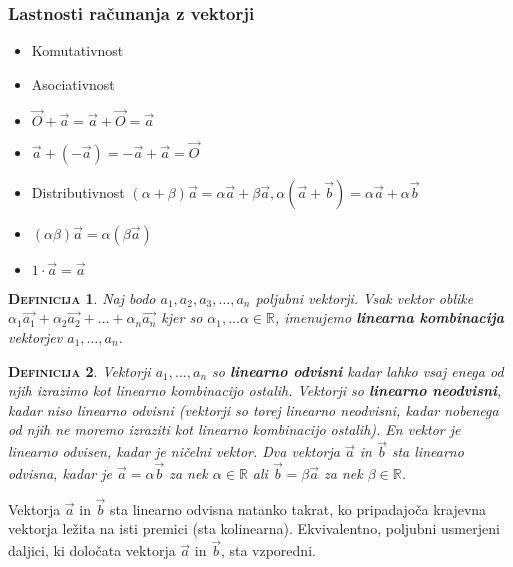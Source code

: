 \documentclass[a4paper,12pt]{article}
\newtheorem*{definicija}{\textsc{Definicija}}
\begin{document}
\begin{center}
\subsubsection{Lastnosti računanja z vektorji}
\end{center}

\begin{itemize}
\item Komutativnost
\item Asociativnost
\item $\vec{O} + \vec{a} = \vec{a} + \vec{O} = \vec{a}$
\item $\vec{a} + (-\vec{a}) = -\vec{a} + \vec{a} = \vec{O}$
\item Distributivnost $(\alpha + \beta)\vec{a} = \alpha \vec{a} + \beta \vec{a}, \alpha (\vec{a} + \vec{b}) = \alpha \vec{a} + \alpha \vec{b}$
\item $(\alpha \beta ) \vec{a} = \alpha ( \beta \vec{a})$
\item  $ 1 \cdot \vec{a} = \vec{a}$\\
\end{itemize}

\begin{definicija}
Naj bodo $a_1, a_2, a_3, \ldots , a_n$ poljubni vektorji. Vsak vektor oblike \linebreak  $\alpha_1 \vec{a_1} + \alpha_2 \vec{a_2} + \ldots + \alpha_n \vec{a_n}$ kjer so $ \alpha_1, \ldots \alpha \in \mathbb{R} $, imenujemo \textbf{linearna kombinacija} vektorjev $a_1, \ldots , a_n$.\\
\end{definicija}

\begin{definicija}
Vektorji $a_1, \ldots , a_n$ so \textbf{linearno odvisni} kadar lahko vsaj enega od njih izrazimo kot linearno kombinacijo ostalih. Vektorji so \textbf{linearno neodvisni}, kadar niso linearno odvisni (vektorji so torej linearno neodvisni, kadar nobenega od njih ne moremo izraziti kot linearno kombinacijo ostalih). En vektor je linearno odvisen, kadar je ničelni vektor. Dva vektorja $\vec{a}$ in $\vec{b}$ sta linearno odvisna, kadar je $ \vec{a} = \alpha \vec{b}$ za nek $\alpha \in \mathbb{R}$ ali $\vec{b} = \beta \vec{a}$ za nek $\beta \in \mathbb{R}$. \\
\end{definicija}

Vektorja $\vec{a}$ in $\vec{b}$ sta linearno odvisna natanko takrat, ko pripadajoča krajevna vektorja ležita na isti premici (sta kolinearna). Ekvivalentno, poljubni usmerjeni daljici, ki določata vektorja $\vec{a}$ in $ \vec{b}$, sta vzporedni. \\
\end{document}
